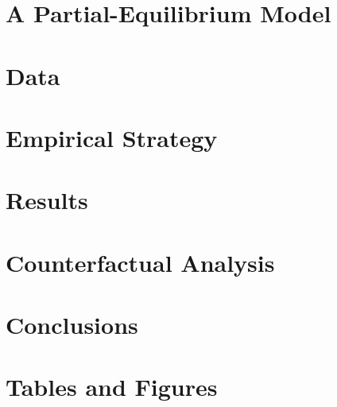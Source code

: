 \documentclass{article}
\begin{document}
\section{A Partial-Equilibrium Model}\label{sec:model}
    

\section{Data}\label{sec:data}
    

\section{Empirical Strategy}\label{sec:empirical_strategy}
    

\section{Results}\label{sec:results}
    

\section{Counterfactual Analysis}\label{sec:counterfactual}
    

\section{Conclusions}\label{sec:conclusion}
    



\clearpage
\printbibliography

\clearpage
\section*{Tables and Figures}

\clearpage


\clearpage

\clearpage

\clearpage


\end{document}
